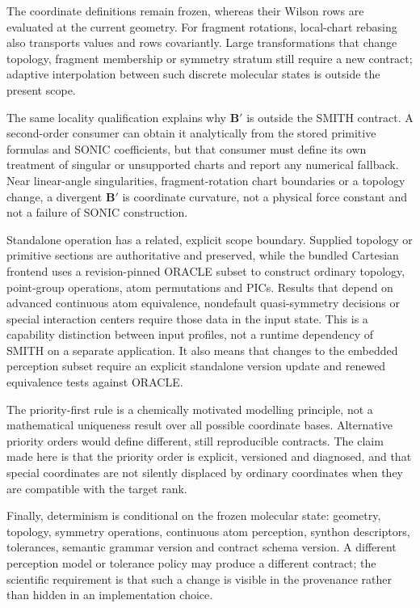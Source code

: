 \documentclass[journal=jctcce,manuscript=article,layout=traditional]{achemso}
\newcommand{\Bmat}{\mathbf{B}}
\theoremstyle{definition}
\begin{document}
The coordinate definitions remain frozen, whereas their Wilson rows are
evaluated at the current geometry.  For fragment rotations, local-chart
rebasing also transports values and rows covariantly.  Large transformations
that change topology, fragment membership or symmetry stratum still require a
new contract; adaptive interpolation between such discrete molecular states is
outside the present scope.

The same locality qualification explains why \(\Bmat'\) is outside the SMITH
contract.  A second-order consumer can obtain it analytically from the stored
primitive formulas and SONIC coefficients, but that consumer must define its
own treatment of singular or unsupported charts and report any numerical
fallback.  Near linear-angle singularities, fragment-rotation chart boundaries
or a topology change, a divergent \(\Bmat'\) is coordinate curvature, not a
physical force constant and not a failure of SONIC construction.

Standalone operation has a related, explicit scope boundary.  Supplied
topology or primitive sections are authoritative and preserved, while the
bundled Cartesian frontend uses a revision-pinned ORACLE subset to construct
ordinary topology, point-group operations, atom permutations and PICs.  Results
that depend on advanced continuous atom equivalence, nondefault quasi-symmetry
decisions or special interaction centers require those data in the input state.
This is a capability distinction between input profiles, not a runtime
dependency of SMITH on a separate application.  It also means that changes to
the embedded perception subset require an explicit standalone version update
and renewed equivalence tests against ORACLE.

The priority-first rule is a chemically motivated modelling principle, not a
mathematical uniqueness result over all possible coordinate bases.  Alternative
priority orders would define different, still reproducible contracts.  The
claim made here is that the priority order is explicit, versioned and
diagnosed, and that special coordinates are not silently displaced by
ordinary coordinates when they are compatible with the target rank.

Finally, determinism is conditional on the frozen molecular state:
geometry, topology, symmetry operations, continuous atom perception, synthon
descriptors, tolerances, semantic grammar version and contract schema version.
A different perception model or tolerance policy may produce a different
contract; the scientific requirement is that such a change is visible in the
provenance rather than hidden in an implementation choice.
\end{document}

